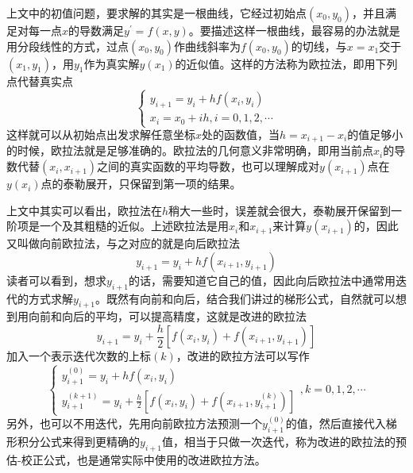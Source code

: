 \documentclass[12pt,a4paper,openany,twoside]{book}
\numberwithin{equation}{section}
\begin{document}
            上文中的初值问题，要求解的其实是一根曲线，它经过初始点$(x_0,y_0)$，并且满足对每一点$x$的导数满足$y^{\prime}=f(x, y)$。要描述这样一根曲线，最容易的办法就是用分段线性的方式，过点$(x_0,y_0)$作曲线斜率为$f(x_0,y_0)$的切线，与$x=x_1$交于$(x_1,y_1)$，用$y_1$作为真实解$y(x_1)$的近似值。这样的方法称为欧拉法，即用下列点代替真实点
            \begin{equation}
              \left\{\begin{array}{l}
                {y_{i+1}=y_{i}+h f\left(x_{i}, y_{i}\right)} \\
                {x_{i}=x_{0}+i h, i=0,1,2, \cdots}
              \end{array}\right.
            \end{equation}
            这样就可以从初始点出发求解任意坐标$x$处的函数值，当$h = x_{i+1}-x_i$的值足够小的时候，欧拉法就是足够准确的。欧拉法的几何意义非常明确，即用当前点$x_i$的导数代替$(x_i,x_{i+1})$之间的真实函数的平均导数，也可以理解成对$y(x_{i+1})$点在$y(x_i)$点的泰勒展开，只保留到第一项的结果。

            上文中其实可以看出，欧拉法在$h$稍大一些时，误差就会很大，泰勒展开保留到一阶项是一个及其粗糙的近似。上述欧拉法是用$x_i$和$x_{i+1}$来计算$y(x_{i+1})$的，因此又叫做向前欧拉法，与之对应的就是向后欧拉法
            \begin{equation}
              y_{i+1}=y_{i}+h f\left(x_{i+1}, y_{i+1}\right)
            \end{equation}
            读者可以看到，想求$y_{i+1}$的话，需要知道它自己的值，因此向后欧拉法中通常用迭代的方式求解$y_{i+1}$。既然有向前和向后，结合我们讲过的梯形公式，自然就可以想到用向前和向后的平均，可以提高精度，这就是改进的欧拉法
            \begin{equation*}
              y_{i+1}=y_{i}+\frac{h}{2}\left[f\left(x_{i}, y_{i}\right)+f\left(x_{i+1}, y_{i+1}\right)\right]
            \end{equation*}
            加入一个表示迭代次数的上标$(k)$，改进的欧拉方法可以写作
            \begin{equation}
              \left\{\begin{array}{l}
                {y_{i+1}^{(0)}=y_{i}+h f\left(x_{i}, y_{i}\right)} \\
                {y_{i+1}^{(k+1)}=y_{i}+\frac{h}{2}\left[f\left(x_{i}, y_{i}\right)+f\left(x_{i+1}, y_{i+1}^{(k)}\right)\right]}
              \end{array}\right., k=0,1,2, \cdots
            \end{equation}
            另外，也可以不用迭代，先用向前欧拉方法预测一个$y_{i+1}^{(0)}$的值，然后直接代入梯形积分公式来得到更精确的$y_{i+1}$值，相当于只做一次迭代，称为改进的欧拉法的预估-校正公式，也是通常实际中使用的改进欧拉方法。
\end{document}
